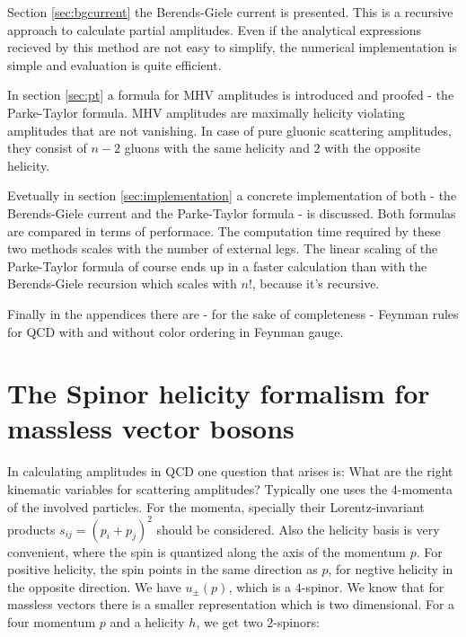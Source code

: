 \documentclass{article}
\theoremstyle{definition}
\numberwithin{equation}{section}
\begin{document}
Section \ref{sec:bgcurrent} the Berends-Giele current is presented. This is a recursive approach to calculate partial amplitudes. Even if the analytical expressions recieved by this method are not easy to simplify, the numerical implementation is simple and evaluation is quite efficient.

In section \ref{sec:pt} a formula for MHV amplitudes is introduced and proofed - the Parke-Taylor formula. MHV amplitudes are maximally helicity violating amplitudes that are not vanishing. In case of pure gluonic scattering amplitudes, they consist of $n-2$ gluons with the same helicity and $2$ with the opposite helicity.

Evetually in section \ref{sec:implementation} a concrete implementation of both - the Berends-Giele current and the Parke-Taylor formula - is discussed. Both formulas are compared in terms of performace. The computation time required by these two methods scales with the number of external legs. The linear scaling of the Parke-Taylor formula of course ends up in a faster calculation than with the Berends-Giele recursion which scales with $n!$, because it's recursive. 

Finally in the appendices there are - for the sake of completeness - Feynman rules for QCD with and without color ordering in Feynman gauge.

\section{The Spinor helicity formalism for massless vector bosons}
\label{sec:spinor}

In calculating amplitudes in QCD one question that arises is: What are the right kinematic variables for scattering amplitudes? Typically one uses the 4-momenta of the involved particles. For the momenta, specially their Lorentz-invariant products $s_{ij} = \left( p_i + p_j \right)^2$ should be considered. Also the helicity basis \cite{berends81} is very convenient, where the spin is quantized along the axis of the momentum $p$. For positive helicity, the spin points in the same direction as $p$, for negtive helicity in the opposite direction. We have $u_{\pm}(p)$, which is a $4$-spinor. We know that for massless vectors there is a smaller representation which is two dimensional. For a four momentum $p$ and a helicity $h$, we get two $2$-spinors:
\end{document}

